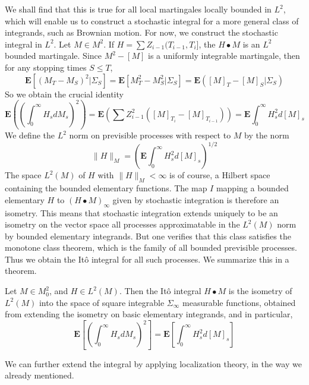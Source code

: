 We shall find that this is true for all local martingales locally bounded in $L^2$, which will enable us to construct a stochastic integral for a more general class of integrands, such as Brownian motion. For now, we construct the stochastic integral in $L^2$. Let $M \in M^2$. If $H = \sum Z_{i-1} (T_{i-1},T_i]$, the $H \bullet M$ is an $L^2$ bounded martingale. Since $M^2 - [M]$ is a uniformly integrable martingale, then for any stopping times $S \leq T$,
%
\[ \mathbf{E}[(M_T - M_S)^2|\Sigma_S] = \mathbf{E}[M_T^2 - M_S^2 | \Sigma_S] = \mathbf{E}([M]_T - [M]_S | \Sigma_S) \]
%
So we obtain the crucial identity
%
\[ \mathbf{E} \left( \left( \int_0^\infty H_s dM_s \right)^2 \right) = \mathbf{E} \left( \sum Z_{i-1}^2 ([M]_{T_i} - [M]_{T_{i-1}}) \right) = \mathbf{E} \int_0^\infty H_s^2 d[M]_s \]
%
We define the $L^2$ norm on previsible processes with respect to $M$ by the norm
%
\[ \| H \|_M = \left( \mathbf{E} \int_0^\infty H_s^2 d[M]_s \right)^{1/2} \]
%
The space $L^2(M)$ of $H$ with $\| H \|_M < \infty$ is of course, a Hilbert space containing the bounded elementary functions. The map $I$ mapping a bounded elementary $H$ to $(H \bullet M)_\infty$ given by stochastic integration is therefore an isometry. This means that stochastic integration extends uniquely to be an isometry on the vector space all processes approximatable in the $L^2(M)$ norm by bounded elementary integrands. But one verifies that this class satisfies the monotone class theorem, which is the family of all bounded previsible processes. Thus we obtain the It\^{o} integral for all such processes. We summarize this in a theorem.

\begin{theorem}
    Let $M \in M_0^2$, and $H \in L^2(M)$. Then the It\^{o} integral $H \bullet M$ is the isometry of $L^2(M)$ into the space of square integrable $\Sigma_\infty$ measurable functions, obtained from extending the isometry on basic elementary integrands, and in particular,
    \[ \mathbf{E} \left[ \left( \int_0^\infty H_s dM_s \right)^2 \right] = \mathbf{E} \left[ \int_0^\infty H_s^2 d[M]_s \right] \]
\end{theorem}

We can further extend the integral by applying localization theory, in the way we already mentioned.

